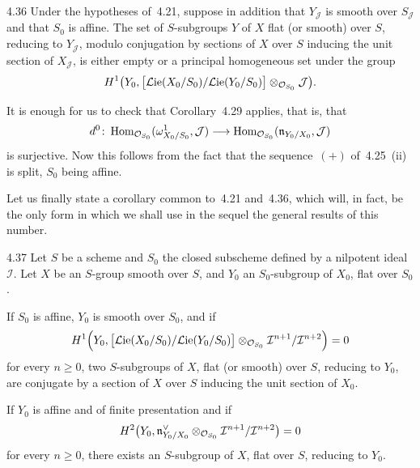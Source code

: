 \begin{proposition}{4.36}
\label{III.4.36}
Under the hypotheses of~4.21, suppose in addition that \(Y_{\mathcal{J}}\)
is smooth over \(S_{\mathcal{J}}\) and that \(S_0\) is affine. The set of
\(S\)-subgroups \(Y\) of \(X\) flat (or smooth) over \(S\), reducing to
\(Y_{\mathcal{J}}\), modulo conjugation by sections of \(X\) over \(S\)
inducing the unit section of \(X_{\mathcal{J}}\), is either empty or a
principal homogeneous set under the group
\[
H^{1}\bigl(Y_0,
\bigl[\mathcal{L}\mathrm{ie}(X_0/S_0)/\mathcal{L}\mathrm{ie}(Y_0/S_0)\bigr]
\otimes_{\mathcal{O}_{S_0}}\mathcal{J}\bigr).
\]
\end{proposition}

It is enough for us to check that Corollary~4.29 applies, that is, that
\[
d^{0}\colon\operatorname{Hom}_{\mathcal{O}_{S_0}}(\omega^{1}_{X_0/S_0},\mathcal{J})
\longrightarrow
\operatorname{Hom}_{\mathcal{O}_{S_0}}(\mathfrak{n}_{Y_0/X_0},\mathcal{J})
\]
is surjective. Now this follows from the fact that the sequence~\((+)\)
of~4.25~(ii) is split, \(S_0\) being
affine.{\renewcommand{\thefootnote}{(133)}}

Let us finally state a corollary common to~4.21 and~4.36, which will, in
fact, be the only form in which we shall use in the sequel the general
results of this
number.{\renewcommand{\thefootnote}{(134)}}

\begin{corollary}{4.37}
\label{III.4.37}
Let \(S\) be a scheme and \(S_0\) the closed subscheme defined by a
nilpotent ideal \(\mathcal{I}\). Let \(X\) be an \(S\)-group smooth over
\(S\), and \(Y_0\) an \(S_0\)-subgroup of \(X_0\), flat over \(S_0\).
\begin{enumeratei}
\item If \(S_0\) is affine, \(Y_0\) is smooth over \(S_0\), and if
\[
H^{1}\Bigl(Y_0,
\bigl[\mathcal{L}\mathrm{ie}(X_0/S_0)/\mathcal{L}\mathrm{ie}(Y_0/S_0)\bigr]
\otimes_{\mathcal{O}_{S_0}}\mathcal{I}^{n+1}/\mathcal{I}^{n+2}\Bigr)=0
\]
for every \(n\geqslant 0\), two \(S\)-subgroups of \(X\), flat (or smooth)
over \(S\), reducing to \(Y_0\), are conjugate by a section of \(X\) over
\(S\) inducing the unit section of \(X_0\).
\item If \(Y_0\) is affine and of finite presentation and
if{\renewcommand{\thefootnote}{(135)}}
\[
H^{2}\bigl(Y_0,\mathfrak{n}^{\vee}_{Y_0/X_0}\otimes_{\mathcal{O}_{S_0}}
\mathcal{I}^{n+1}/\mathcal{I}^{n+2}\bigr)=0
\]
for every \(n\geqslant 0\), there exists an \(S\)-subgroup of \(X\), flat
over \(S\), reducing to \(Y_0\).
\end{enumeratei}
\end{corollary}


